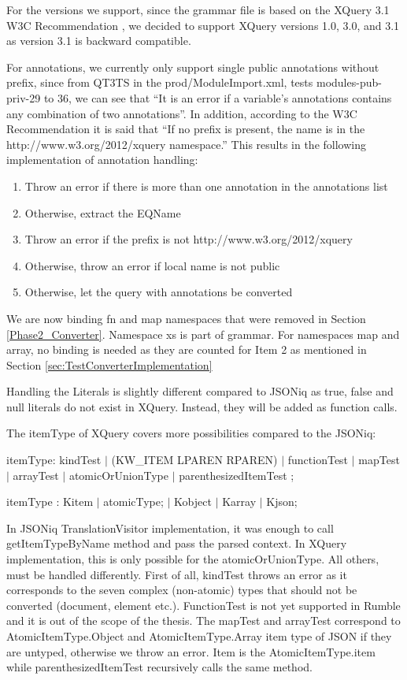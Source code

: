 For the versions we support, since the grammar file is based on the XQuery 3.1 W3C Recommendation \cite{XQueryRecommendation}, we decided to support XQuery versions 1.0, 3.0, and 3.1 as version 3.1 is backward compatible.

For annotations, we currently only support single public annotations without prefix, since from QT3TS in the prod/ModuleImport.xml, tests modules-pub-priv-29 to 36, we can see that ``It is an error if a variable's annotations contains any combination of two annotations''. In addition, according to the W3C Recommendation \cite{XQueryRecommendation} it is said that ``If no prefix is present, the name is in the http://www.w3.org/2012/xquery namespace.'' This results in the following implementation of annotation handling:
\begin{enumerate}
	\item Throw an error if there is more than one annotation in the annotations list
	\item Otherwise, extract the EQName
	\item Throw an error if the prefix is not http://www.w3.org/2012/xquery 
	\item Otherwise, throw an error if local name is not public
	\item Otherwise, let the query with annotations be converted
\end{enumerate}

We are now binding fn and map namespaces that were removed in Section \ref{Phase2_Converter}. Namespace xs is part of grammar. For namespaces map and array, no binding is needed as they are counted for Item 2 as mentioned in Section \ref{sec:TestConverterImplementation}

Handling the Literals is slightly different compared to JSONiq as true, false and null literals do not exist in XQuery. Instead, they will be added as function calls.

The itemType of XQuery covers more possibilities compared to the JSONiq:

itemType: kindTest
$|$ (KW\_ITEM LPAREN RPAREN)
$|$ functionTest
$|$ mapTest
$|$ arrayTest
$|$ atomicOrUnionType
$|$ parenthesizedItemTest ;

itemType                : Kitem
$|$ atomicType;
$|$ Kobject
$|$ Karray
$|$ Kjson;

In JSONiq TranslationVisitor implementation, it was enough to call getItemTypeByName method and pass the parsed context. In XQuery implementation, this is only possible for the atomicOrUnionType. All others, must be handled differently. First of all, kindTest throws an error as it corresponds to the seven complex (non-atomic) types that should not be converted (document, element etc.). FunctionTest is not yet supported in Rumble and it is out of the scope of the thesis. The mapTest and arrayTest correspond to AtomicItemType.Object and AtomicItemType.Array item type of JSON if they are untyped, otherwise we throw an error. Item is the AtomicItemType.item while parenthesizedItemTest recursively calls the same method.

